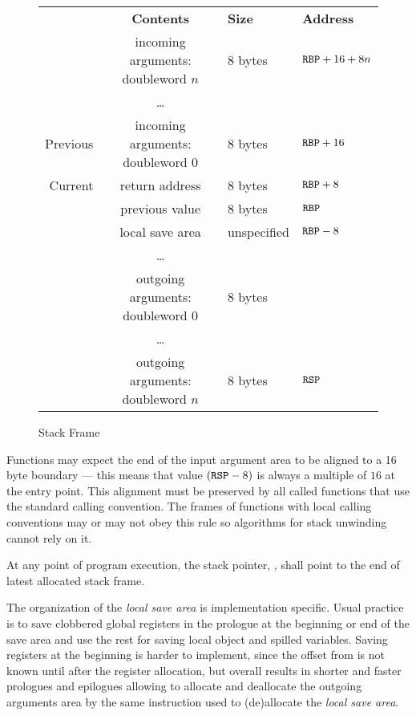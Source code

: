 \begin{figure}
\Hrule
  \caption{Stack Frame}
  \label{fig-stack-frame}
  \begin{center}
    \begin{tabular}{r|cl|l}
      \noalign{\smallskip}
      \multicolumn{1}{l}{\bf Frame} &
      \multicolumn{1}{c}{\bf Contents} &
      \multicolumn{1}{l}{\bf Size} &
      \multicolumn{1}{l}{\bf Address} \\
      \noalign{\smallskip}  \cline{2-3}
      & incoming arguments: doubleword $n$ & 8 bytes & ${\texttt{RBP}}+16+8n$ \\
      & \dots & & \\
      Previous& incoming arguments: doubleword $0$ & 8 bytes & ${\texttt{RBP}}+16$ \\ \cline{1-4} 
      Current & return address & 8 bytes & ${\texttt{RBP}}+8$\\ \cline{2-3}
      & previous \RBP{} value & 8 bytes & ${\texttt{RBP}}$ \\ \cline{2-3}
      & local save area & unspecified & ${\texttt{RBP}}-8$\\ 
      & \dots & & \\ \cline {2-3}
      & outgoing arguments: doubleword $0$ & 8 bytes &\\
      & \dots & & \\
      & outgoing arguments: doubleword $n$ & 8 bytes & ${\texttt{RSP}}$ \\ \cline{2-3}
    \end{tabular}
  \end{center}
\Hrule
\end{figure}


Functions may expect the end of the input argument area to be aligned
to a 16 byte boundary --- this means that value $({\texttt{RSP}} - 8)$ is always a
multiple of $16$ at the entry point. This alignment must be preserved by
all called functions that use the standard calling convention. The
frames of functions with local calling conventions may or may not obey
this rule so algorithms for stack unwinding cannot rely on it.

At any point of program execution, the stack pointer, \RSP, shall point to
the end of  latest allocated stack frame.

The organization of the \emph{local save area} is implementation
specific. Usual practice is to save clobbered global registers in the
prologue at the beginning or end of the save area and use the rest for saving
local object and spilled variables.  Saving registers at the beginning
is harder to implement, since the offset from \RBP{} is not known
until after the register allocation, but overall results in shorter
and faster prologues and epilogues allowing to allocate and deallocate
the outgoing arguments area by the same instruction used to
(de)allocate the \emph{local save area}.

